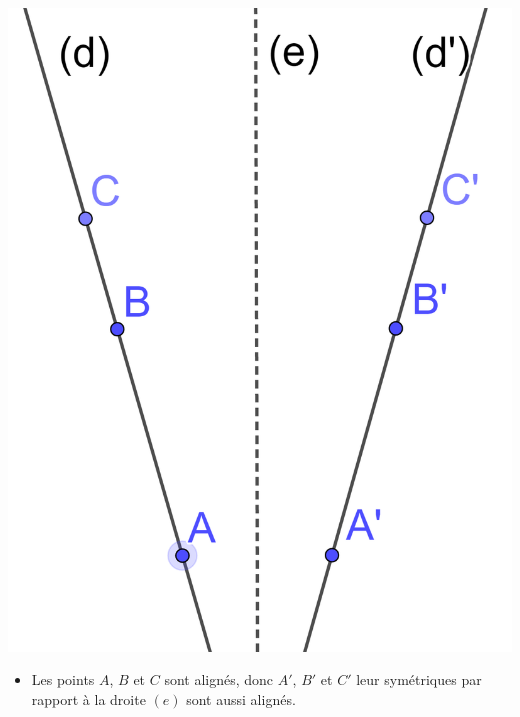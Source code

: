\documentclass[xcolor={dvipsnames}]{beamer}
\begin{document}
\begin{frame}
	\begin{myexs}
		\begin{columns}
			\begin{column}{0.5\textwidth}
				
			
			\begin{center}
				\includegraphics[scale=0.11]{sym_droites1}
			\end{center}
			
			\begin{itemize}
				\item Les points $A$, $B$ et $C$ sont alignés, donc $A'$, $B'$ et $C'$ leur symétriques par rapport à la droite $(e)$ sont \pause aussi alignés.
			\end{itemize}	
			
			\end{column}
		

\end{columns}
\end{myexs}
\end{frame}
\end{document}
